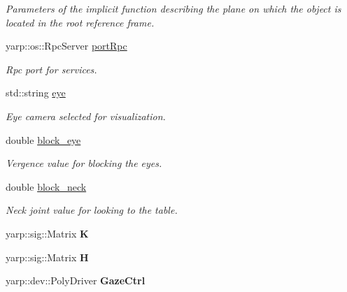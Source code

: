 \begin{DoxyCompactItemize}
\begin{DoxyCompactList}\small\item\em Parameters of the implicit function describing the plane on which the object is located in the root reference frame. \end{DoxyCompactList}\item 
yarp\+::os\+::\+Rpc\+Server \hyperlink{classGraspingModule_a164dc4c91253669941ad45e2702bb746}{port\+Rpc}\label{classGraspingModule_a164dc4c91253669941ad45e2702bb746}

\begin{DoxyCompactList}\small\item\em Rpc port for services. \end{DoxyCompactList}\item 
std\+::string \hyperlink{classGraspingModule_a2d764f516aecffb52ba22f1dcdd2a730}{eye}\label{classGraspingModule_a2d764f516aecffb52ba22f1dcdd2a730}

\begin{DoxyCompactList}\small\item\em Eye camera selected for visualization. \end{DoxyCompactList}\item 
double \hyperlink{classGraspingModule_a9562cc675af9a861201956fe23a267bc}{block\+\_\+eye}\label{classGraspingModule_a9562cc675af9a861201956fe23a267bc}

\begin{DoxyCompactList}\small\item\em Vergence value for blocking the eyes. \end{DoxyCompactList}\item 
double \hyperlink{classGraspingModule_aa92c21ad6a4a5f70f73ebf3281676f62}{block\+\_\+neck}\label{classGraspingModule_aa92c21ad6a4a5f70f73ebf3281676f62}

\begin{DoxyCompactList}\small\item\em Neck joint value for looking to the table. \end{DoxyCompactList}\item 
yarp\+::sig\+::\+Matrix {\bfseries K}\label{classGraspingModule_a161a8c4d8bc2db6e1cf7c00a69953831}

\item 
yarp\+::sig\+::\+Matrix {\bfseries H}\label{classGraspingModule_acb55c5d37d9a7225b44323d2be724bfe}

\item 
yarp\+::dev\+::\+Poly\+Driver {\bfseries Gaze\+Ctrl}\label{classGraspingModule_adfed9afcb5290a5ee2e99768352fd4fb}


\end{DoxyCompactItemize}
